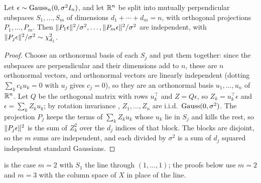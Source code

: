 \begin{proposition}
\label{prop:cochran-general}
Let $\epsilon \sim \text{Gauss}_n(0, \sigma^2I_n)$, and let $\mathbb{R}^n$ be split into mutually perpendicular subspaces $S_1, \ldots, S_m$ of dimensions $d_1 + \cdots + d_m = n$, with orthogonal projections $P_1, \ldots, P_m$.
Then $\lVert P_1\epsilon\rVert^2/\sigma^2, \ldots, \lVert P_m\epsilon\rVert^2/\sigma^2$ are independent, with $\lVert P_j\epsilon\rVert^2/\sigma^2 \sim \chi^2_{d_j}$.
\end{proposition}
\begin{proof}
Choose an orthonormal basis of each $S_j$ and put them together: since the subspaces are perpendicular and their dimensions add to $n$, these are $n$ orthonormal vectors, and orthonormal vectors are linearly independent (dotting $\sum_k c_ku_k = 0$ with $u_j$ gives $c_j = 0$), so they are an orthonormal basis $u_1, \ldots, u_n$ of $\mathbb{R}^n$.
Let $Q$ be the orthogonal matrix with rows $u_k^\top$ and $Z = Q\epsilon$, so $Z_k = u_k^\top\epsilon$ and $\epsilon = \sum_k Z_ku_k$; by rotation invariance , $Z_1, \ldots, Z_n$ are i.i.d.\ $\text{Gauss}(0, \sigma^2)$.
The projection $P_j$ keeps the terms of $\sum_k Z_ku_k$ whose $u_k$ lie in $S_j$ and kills the rest, so $\lVert P_j\epsilon\rVert^2$ is the sum of $Z_k^2$ over the $d_j$ indices of that block.
The blocks are disjoint, so the $m$ sums are independent, and each divided by $\sigma^2$ is a sum of $d_j$ squared independent standard Gaussians.
\end{proof}

 is the case $m = 2$ with $S_1$ the line through $(1, \ldots, 1)$; the proofs below use $m = 2$ and $m = 3$ with the column space of $X$ in place of the line.

